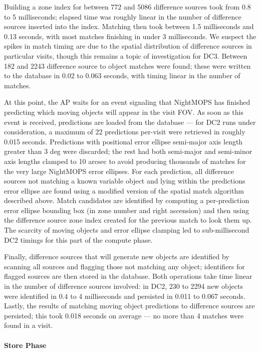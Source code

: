 Building a zone index for between 772 and 5086 difference sources took
from 0.8 to 5 milliseconds; elapsed time was roughly linear in the number of
difference sources inserted into the index. Matching then took between 1.5
milliseconds and 0.13 seconds, with most matches finishing in under 3
milliseconds. We suspect the spikes in match timing are due to the spatial
distribution of difference sources in particular visits, though this remains
a topic of investigation for DC3. Between 182 and 2243 difference source to
object matches were found; these were written to the database in 0.02 to 0.063
seconds, with timing linear in the number of matches.

At this point, the AP waits for an event signaling that NightMOPS has finished
predicting which moving objects will appear in the visit FOV. As soon as this
event is received, predictions are loaded from the database --- for DC2 runs
under consideration, a maximum of 22 predictions per-visit were retrieved in
roughly 0.015 seconds. Predictions with positional error ellipse semi-major
axis length greater than 3 deg were discarded; the rest had both semi-major
and semi-minor axis lengths clamped to 10 arcsec to avoid producing
thousands of matches for the very large NightMOPS error ellipses. For each
prediction, all difference sources not matching a known variable object and
lying within the predictions error ellipse are found using a modified version
of the spatial match algorithm described above. Match candidates are
identified by computing a per-prediction error ellipse bounding box (in zone
number and right ascension) and then using the difference source zone index
created for the previous match to look them up. The scarcity of moving objects
and error ellipse clamping led to sub-millisecond DC2 timings for this part of
the compute phase.

Finally, difference sources that will generate new objects are identified by
scanning all sources and flagging those not matching any object; identifiers
for flagged sources are then stored in the database. Both operations take time
linear in the number of difference sources involved: in DC2, 230 to 2294 new
objects were identified in 0.4 to 4 milliseconds and persisted in 0.011 to
0.067 seconds. Lastly, the results of matching moving object predictions to
difference sources are persisted; this took 0.018 seconds on average --- no more
than 4 matches were found in a visit.

\paragraph{Store Phase}

